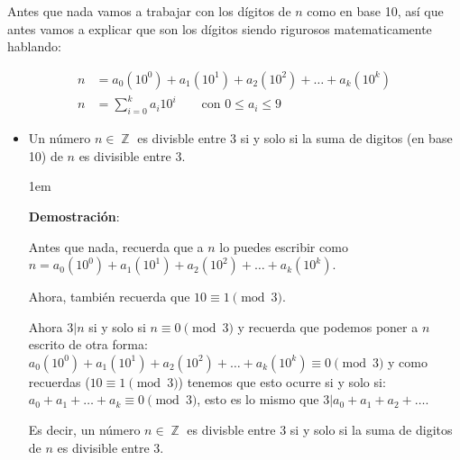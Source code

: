 \documentclass[12pt, fleqn]{report}                             %
\newenvironment{SmallIndentation}[1][0.75em]                    %
    {\begin{adjustwidth}{#1}{}\begin{footnotesize}}                 %
    {\end{footnotesize}\end{adjustwidth}}                           %
\DeclareMathOperator \Space {\quad}                             %
\DeclareMathOperator \Integers  {\mathbb{Z}}                     %
\begin{document}
            Antes que nada vamos a trabajar con los dígitos de $n$ como en base 10,
            así que antes vamos a explicar que son los dígitos siendo rigurosos matematicamente
            hablando:

            \begin{equation}
            \begin{split}
                n &= a_0(10^0) + a_1(10^1) + a_2(10^2) + \dots + a_k(10^k)          \\
                n &= \sum_{i=0}^{k} a_i 10^i \Space \text{ con } 0 \leq a_i \leq 9
            \end{split}
            \end{equation}


            \begin{itemize}

                \item Un número $n \in \Integers$ es divisble entre 3 si y solo si
                    la suma de digitos (en base 10) de $n$ es divisible entre 3.

                    \begin{SmallIndentation}[1em]
                        \textbf{Demostración}:

                        Antes que nada, recuerda que a $n$ lo puedes escribir como
                        $n = a_0(10^0) + a_1(10^1) + a_2(10^2) + \dots + a_k(10^k)$.

                        Ahora, también recuerda que $10 \equiv 1 \pmod{3}$.

                        Ahora $3|n$ si y solo si $n \equiv 0 \pmod{3}$ y recuerda
                        que podemos poner a $n$ escrito de otra forma:
                        $a_0(10^0) + a_1(10^1) + a_2(10^2) + \dots + a_k(10^k) \equiv 0 \pmod{3}$
                        y como recuerdas ($10 \equiv 1 \pmod{3}$) tenemos que esto ocurre
                        si y solo si:  $a_0 + a_1 +\dots +a_k \equiv 0 \pmod{3}$, esto es lo mismo que
                        $3|a_0+a_1+a_2+\dots$.

                        Es decir, un número $n \in \Integers$ es divisble entre 3 si y solo si
                        la suma de digitos de $n$ es divisible entre 3.

                    \end{SmallIndentation}

            \end{itemize}
\end{document}

